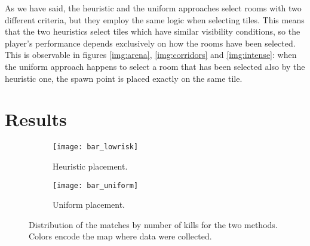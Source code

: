 As we have said, the heuristic and the uniform approaches select rooms with two different criteria, but they employ the same logic when selecting tiles. This means that the two heuristics select tiles which have similar visibility conditions, so the player's performance depends exclusively on how the rooms have been selected. This is observable in figures \ref{img:arena}, \ref{img:corridors} and \ref{img:intense}: when the uniform approach happens to select a room that has been selected also by the heuristic one, the spawn point is placed exactly on the same tile.


\section{Results}

\begin{figure}
\centering
\begin{subfigure}[t]{0.8\linewidth}
\texttt{[image: bar\_lowrisk]}
\caption{Heuristic placement.}
\label{img:bar_lowrisk}
\end{subfigure} 
\begin{subfigure}[t]{0.8\linewidth}
\texttt{[image: bar\_uniform]}
\caption{Uniform placement.}
\label{img:bar_uniform}
\end{subfigure}
\caption[Distribution of the matches by number of kills for the two methods.]{Distribution of the matches by number of kills for the two methods. Colors encode the map where data were collected.}
\label{img:match_distribution} 
\end{figure}

